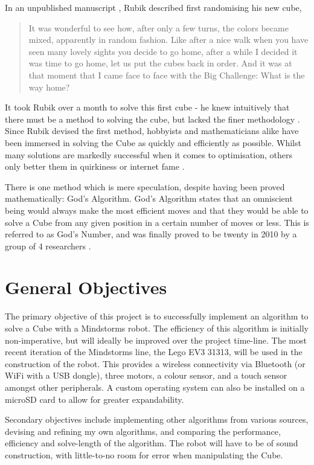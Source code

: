 \documentclass{report}
\begin{document}
    In an unpublished manuscript \cite{Rubik1986}, Rubik described first randomising his new cube, \blockquote{It was wonderful to see how, after only a few turns, the colors became mixed, apparently in random fashion. Like after a nice walk when you have seen many lovely sights you decide to go home, after a while I decided it was time to go home, let us put the cubes back in order. And it was at that moment that I came face to face with the Big Challenge: What is the way home?}
    
    It took Rubik over a month to solve this first cube - he knew intuitively that there must be a method to solving the cube, but lacked the finer methodology \cite{RubiksCube}. Since Rubik devised the first method, hobbyists and mathematicians alike have been immersed in solving the Cube as quickly and efficiently as possible. Whilst many solutions are markedly successful when it comes to optimisation, others only better them in quirkiness or internet fame \cite{Chan2016}.
    
    There is one method which is mere speculation, despite having been proved mathematically: God's Algorithm. God's Algorithm states that an omniscient being would always make the most efficient moves and that they would be able to solve a Cube from any given position in a certain number of moves or less. This is referred to as God's Number, and was finally proved to be twenty in 2010 by a group of 4 researchers \cite{Rokicki2010}.
    
    \section{General Objectives}
    The primary objective of this project is to successfully implement an algorithm to solve a Cube with a Mindstorms robot. The efficiency of this algorithm is initially non-imperative, but will ideally be improved over the project time-line. The most recent iteration of the Mindstorms line, the Lego EV3 31313, will be used in the construction of the robot. This provides a wireless connectivity via Bluetooth (or WiFi with a USB dongle), three motors, a colour sensor, and a touch sensor amongst other peripherals. A custom operating system can also be installed on a microSD card to allow for greater expandability.
    
    Secondary objectives include implementing other algorithms from various sources, devising and refining my own algorithms, and comparing the performance, efficiency and solve-length of the algorithm. The robot will have to be of sound construction, with little-to-no room for error when manipulating the Cube.
    
\end{document}
